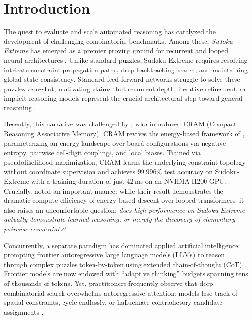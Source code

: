 \documentclass{article} %
\begin{document}
\section{Introduction}
\label{sec:intro}

The quest to evaluate and scale automated reasoning has catalyzed the development of challenging combinatorial benchmarks. Among these, \textit{Sudoku-Extreme} \citep{sapientinc2024sudoku} has emerged as a premier proving ground for recurrent and looped neural architectures \citep{dehghani2018universal, giannou2023looped, banino2021pico}. Unlike standard puzzles, Sudoku-Extreme requires resolving intricate constraint propagation paths, deep backtracking search, and maintaining global state consistency. Standard feed-forward networks struggle to solve these puzzles zero-shot, motivating claims that recurrent depth, iterative refinement, or implicit reasoning models represent the crucial architectural step toward general reasoning \citep{arora2024looped, pathak2024recurrent}.

Recently, this narrative was challenged by \citet{hoover2026cram}, who introduced CRAM (Compact Reasoning Associative Memory). CRAM revives the energy-based framework of \citet{hopfield1985neural}, parameterizing an energy landscape over board configurations via negative entropy, pairwise cell-digit couplings, and local biases. Trained via pseudolikelihood maximization, CRAM learns the underlying constraint topology without coordinate supervision and achieves $99.996\%$ test accuracy on Sudoku-Extreme with a training duration of just $42\,\mathrm{ms}$ on an NVIDIA H200 GPU. Crucially, \citet{hoover2026cram} noted an important nuance: while their result demonstrates the dramatic compute efficiency of energy-based descent over looped transformers, it also raises an uncomfortable question: \textit{does high performance on Sudoku-Extreme actually demonstrate learned reasoning, or merely the discovery of elementary pairwise constraints?}

Concurrently, a separate paradigm has dominated applied artificial intelligence: prompting frontier autoregressive large language models (LLMs) to reason through complex puzzles token-by-token using extended chain-of-thought (CoT) \citep{wei2022chain, nye2021workscratchpad, lightman2023lets}. Frontier models are now endowed with ``adaptive thinking'' budgets spanning tens of thousands of tokens. Yet, practitioners frequently observe that deep combinatorial search overwhelms autoregressive attention: models lose track of spatial constraints, cycle endlessly, or hallucinate contradictory candidate assignments \citep{dziri2023faith, valmeekam2023planning}.
\end{document}
